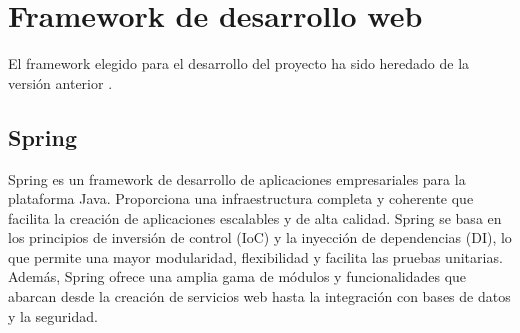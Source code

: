\section{Framework de desarrollo web}
El framework elegido para el desarrollo del proyecto ha sido heredado de la versión anterior \cite{previotfg}.
\subsection{Spring}
Spring es un framework de desarrollo de aplicaciones empresariales para la plataforma Java. Proporciona una infraestructura completa y coherente que facilita la creación de aplicaciones escalables y de alta calidad. Spring se basa en los principios de inversión de control (IoC) y la inyección de dependencias (DI), lo que permite una mayor modularidad, flexibilidad y facilita las pruebas unitarias. Además, Spring ofrece una amplia gama de módulos y funcionalidades que abarcan desde la creación de servicios web hasta la integración con bases de datos y la seguridad.